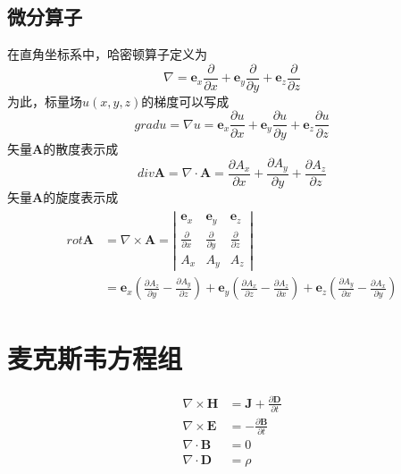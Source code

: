\documentclass[bachelor]{XJTUthesis}
\begin{document}
\subsection{微分算子}
在直角坐标系中，哈密顿算子定义为\cite{冯慈璋2000工程电磁场导论}
\begin{equation}
    \nabla = \bm{e}_x\frac{\partial}{\partial x}+\bm{e}_y\frac{\partial}{\partial y}+\bm{e}_z\frac{\partial}{\partial z}
\end{equation}
为此，标量场$u(x,y,z)$的梯度可以写成
\begin{equation}
    grad u = \nabla u = \bm{e}_x\frac{\partial u}{\partial x}+\bm{e}_y\frac{\partial u}{\partial y}+\bm{e}_z\frac{\partial u}{\partial z}
\end{equation}
矢量$\bm{A}$的散度表示成
\begin{equation}
    div \bm{A} = \nabla\cdot\bm{A} = \frac{\partial A_x}{\partial x}+\frac{\partial A_y}{\partial y}+\frac{\partial A_z}{\partial z}
\end{equation}
矢量$\bm{A}$的旋度表示成
\begin{align}
\begin{split}
  rot \bm{A} & = \nabla\times\bm{A} =
  \left|
  \begin{array}{ccc}
    \bm{e}_x & \bm{e}_y & \bm{e}_z \\
    \frac{\partial}{\partial x} & \frac{\partial}{\partial y} & \frac{\partial}{\partial z} \\
    A_x & A_y & A_z
  \end{array}
  \right| \\
   & =\bm{e}_x \left(\frac{\partial A_z}{\partial y}-\frac{\partial A_y}{\partial z}\right)+\bm{e}_y \left(\frac{\partial A_x}{\partial z}-\frac{\partial A_z}{\partial x}\right)+\bm{e}_z \left(\frac{\partial A_y}{\partial x}-\frac{\partial A_x}{\partial y}\right)
\end{split}
\end{align}
\section{麦克斯韦方程组}
\begin{align}\label{maxwell}
  \nabla\times\bm{H} & =\bm{J}+\frac{\partial\bm{D}}{\partial t} \\
  \nabla\times\bm{E} & =-\frac{\partial\bm{B}}{\partial t} \\
  \nabla\cdot\bm{B} & =0 \\
  \nabla\cdot\bm{D} & =\rho
\end{align}
\end{document}
